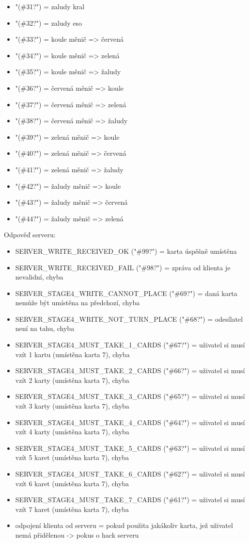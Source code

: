 \documentclass[12pt, a4paper, pdftex, czech, titlepage]{report}
\begin{document}
\begin{itemize}
\item "(\#31?") = zaludy kral
\item "(\#32?") = zaludy eso
\item "(\#33?") = koule měnič => červená
\item "(\#34?") = koule měnič => zelená
\item "(\#35?") = koule měnič => žaludy
\item "(\#36?") = červená měnič => koule
\item "(\#37?") = červená měnič => zelená
\item "(\#38?") = červená měnič => žaludy
\item "(\#39?") = zelená měnič => koule
\item "(\#40?") = zelená měnič => červená
\item "(\#41?") = zelená měnič => žaludy
\item "(\#42?") = žaludy měnič => koule
\item "(\#43?") = žaludy měnič => červená
\item "(\#44?") = žaludy měnič => zelená
\end{itemize}

Odpověď serveru:
\begin{itemize}
\item SERVER\_WRITE\_RECEIVED\_OK ("\#99?") = karta úspěšně umístěna
\item SERVER\_WRITE\_RECEIVED\_FAIL ("\#98?") = zpráva od klienta je nevalidní, chyba
\item SERVER\_STAGE4\_WRITE\_CANNOT\_PLACE ("\#69?") = daná karta nemůže být umístěna na předchozí, chyba
\item SERVER\_STAGE4\_WRITE\_NOT\_TURN\_PLACE ("\#68?") = odesílatel není na tahu, chyba
\item SERVER\_STAGE4\_MUST\_TAKE\_1\_CARDS ("\#67?") = uživatel si musí vzít 1 kartu (umístěna karta 7), chyba
\item SERVER\_STAGE4\_MUST\_TAKE\_2\_CARDS ("\#66?") = uživatel si musí vzít 2 karty (umístěna karta 7), chyba
\item SERVER\_STAGE4\_MUST\_TAKE\_3\_CARDS ("\#65?") = uživatel si musí vzít 3 karty (umístěna karta 7), chyba
\item SERVER\_STAGE4\_MUST\_TAKE\_4\_CARDS ("\#64?") = uživatel si musí vzít 4 karty (umístěna karta 7), chyba
\item SERVER\_STAGE4\_MUST\_TAKE\_5\_CARDS ("\#63?") = uživatel si musí vzít 5 karet (umístěna karta 7), chyba
\item SERVER\_STAGE4\_MUST\_TAKE\_6\_CARDS ("\#62?") = uživatel si musí vzít 6 karet (umístěna karta 7), chyba
\item SERVER\_STAGE4\_MUST\_TAKE\_7\_CARDS ("\#61?") = uživatel si musí vzít 7 karet (umístěna karta 7), chyba
\item odpojení klienta od serveru = pokud použita jakákoliv karta, jež uživatel nemá přidělenou -> pokus o hack serveru
\end{itemize}
\end{document}
